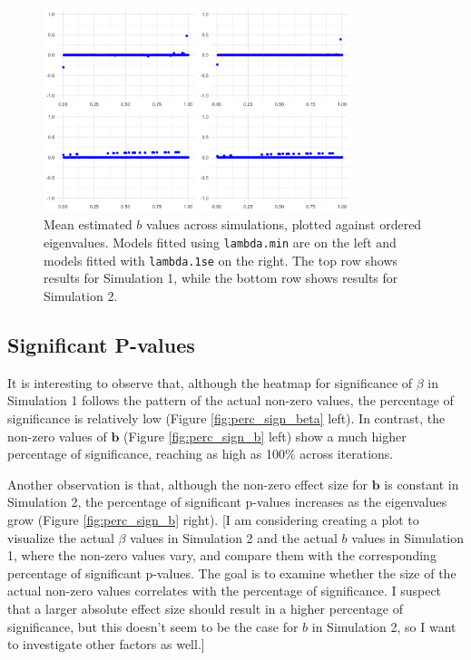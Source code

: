 \documentclass[12pt]{article}
\begin{document}
\begin{figure}[H]
	\centering
	\includegraphics[width=0.8\textwidth]{b_estimates.png}
	\caption{Mean estimated \( b \) values across simulations, plotted against ordered eigenvalues. Models fitted using
		\texttt{lambda.min} are on the left and models fitted with \texttt{lambda.1se} on the right. The top row shows results for Simulation 1, while the bottom row shows results for Simulation 2.}
	\label{fig:b_estimates}
\end{figure}

\FloatBarrier

\subsection*{Significant P-values}

It is interesting to observe that, although the heatmap for significance of \( \beta \) in Simulation 1 follows the pattern of the actual non-zero values, the percentage of significance is relatively low (Figure \ref{fig:perc_sign_beta} left). In contrast, the non-zero values of \( \mathbf{b} \) (Figure \ref{fig:perc_sign_b} left) show a much higher percentage of significance, reaching as high as 100\% across iterations.

Another observation is that, although the non-zero effect size for \( \mathbf{b} \) is constant in Simulation 2, the percentage of significant p-values increases as the eigenvalues grow (Figure \ref{fig:perc_sign_b} right). [I am considering creating a plot to visualize the actual \( \beta \) values in Simulation 2 and the actual \( b \) values in Simulation 1, where the non-zero values vary, and compare them with the corresponding percentage of significant p-values. The goal is to examine whether the size of the actual non-zero values correlates with the percentage of significance. I suspect that a larger absolute effect size should result in a higher percentage of significance, but this doesn’t seem to be the case for \( b \) in Simulation 2, so I want to investigate other factors as well.]
\end{document}
